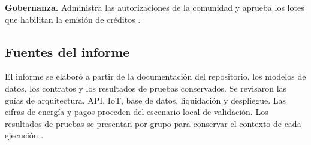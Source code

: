 \textbf{Gobernanza.} Administra las autorizaciones de la comunidad y aprueba los lotes que habilitan la emisión de créditos \citep{blockchain,security}.

\subsection{Fuentes del informe}
El informe se elaboró a partir de la documentación del repositorio, los modelos de datos, los contratos y los resultados de pruebas conservados. Se revisaron las guías de arquitectura, API, IoT, base de datos, liquidación y despliegue. Las cifras de energía y pagos proceden del escenario local de validación. Los resultados de pruebas se presentan por grupo para conservar el contexto de cada ejecución \citep{architecture,database,iot,verification}.
